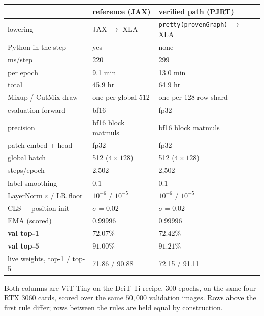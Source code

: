 \begin{center}
\begin{tabular}{@{}l l l@{}}
\hline
 & reference (JAX) & verified path (PJRT) \\
\hline
lowering             & JAX $\to$ XLA            & \texttt{pretty(provenGraph)} $\to$ XLA \\
Python in the step   & yes                      & none \\
ms/step              & 220                      & 299 \\
per epoch            & 9.1 min                  & 13.0 min \\
total                & 45.9 hr                  & 64.9 hr \\
Mixup / CutMix draw  & one per global 512       & one per 128-row shard \\
evaluation forward   & bf16                     & fp32 \\
\hline
precision            & bf16 block matmuls       & bf16 block matmuls \\
patch embed + head   & fp32                     & fp32 \\
global batch         & 512 ($4\times128$)       & 512 ($4\times128$) \\
steps/epoch          & 2{,}502                  & 2{,}502 \\
label smoothing      & $0.1$                    & $0.1$ \\
LayerNorm $\varepsilon$ / LR floor & $10^{-6}$ / $10^{-5}$ & $10^{-6}$ / $10^{-5}$ \\
CLS + position init  & $\sigma = 0.02$          & $\sigma = 0.02$ \\
EMA (scored)         & 0.99996                  & 0.99996 \\
\hline
\textbf{val top-1}   & $\mathbf{72.07\%}$       & $\mathbf{72.42\%}$ \\
\textbf{val top-5}   & $\mathbf{91.00\%}$       & $\mathbf{91.21\%}$ \\
live weights, top-1 / top-5 & 71.86 / 90.88     & 72.15 / 91.11 \\
\hline
\end{tabular}
\end{center}

\noindent Both columns are ViT-Tiny on the DeiT-Ti recipe, 300 epochs, on
the same four RTX 3060 cards, scored over the same $50{,}000$ validation
images. Rows above the first rule differ; rows between the rules are held
equal by construction.


